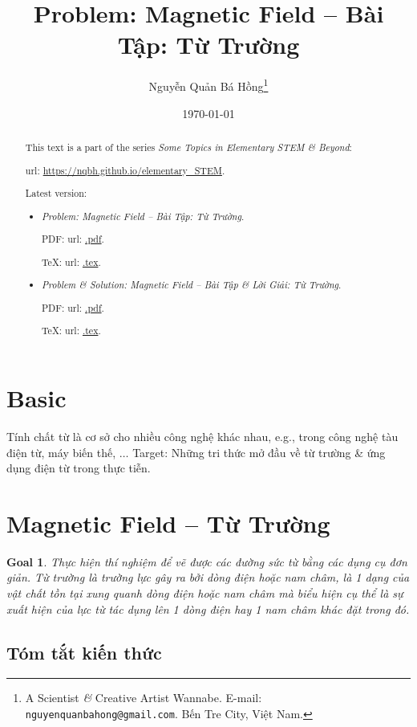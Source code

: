 \documentclass{article}
\title{Problem: Magnetic Field -- Bài Tập: Từ Trường}
\author{Nguyễn Quản Bá Hồng\footnote{A Scientist {\it\&} Creative Artist Wannabe. E-mail: {\tt nguyenquanbahong@gmail.com}. Bến Tre City, Việt Nam.}}
\date{\today}
\newtheorem{goal}{Goal}
\begin{document}
\maketitle
\begin{abstract}
	This text is a part of the series {\it Some Topics in Elementary STEM \& Beyond}:
	
	{\sc url}: \url{https://nqbh.github.io/elementary_STEM}.
	
	Latest version:
	\begin{itemize}
		\item {\it Problem: Magnetic Field -- Bài Tập: Từ Trường}.
		
		PDF: {\sc url}: \url{.pdf}.
		
		\TeX: {\sc url}: \url{.tex}.
		\item {\it Problem \& Solution: Magnetic Field -- Bài Tập \& Lời Giải: Từ Trường}.
		
		PDF: {\sc url}: \url{.pdf}.
		
		\TeX: {\sc url}: \url{.tex}.
	\end{itemize}
\end{abstract}
\tableofcontents


\section{Basic}
Tính chất từ là cơ sở cho nhiều công nghệ khác nhau, e.g., trong công nghệ tàu điện từ, máy biến thế, $\ldots$ Target: Những tri thức mở đầu về từ trường \& ứng dụng điện từ trong thực tiễn.


\section{Magnetic Field -- Từ Trường}

\begin{goal}
	Thực hiện thí nghiệm để vẽ được các đường sức từ bằng các dụng cụ đơn giản. Từ trường là trường lực gây ra bởi dòng điện hoặc nam châm, là 1 dạng của vật chất tồn tại xung quanh dòng điện hoặc nam châm mà biểu hiện cụ thể là sự xuất hiện của lực từ tác dụng lên 1 dòng điện hay 1 nam châm khác đặt trong đó.
\end{goal}

\subsection{Tóm tắt kiến thức}
\end{document}
